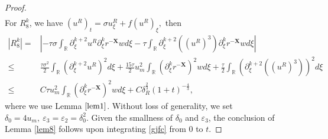 \documentclass[10pt,reqno]{amsart}
\numberwithin{equation}{section}
\begin{document}
\begin{proof}
\begin{align*}
		\end{align*}
		For $R_8^k$, we have $(u^R)_t=\sigma u^R_{\xi}+f(u^R)_{\xi},$ then
		\begin{align*}
			\left|R_8^k\right|=&\left|-\tau\sigma\int_{\mathbb{R}}\partial_{\xi}^{k+2}u^R\partial_{\xi}^kr^{-\mathbf{X}}wd\xi-\tau\int_{\mathbb{R}}\partial_{\xi}^{k+2}\left((u^R)^3\right)\partial_{\xi}^{k}r^{-\mathbf{X}}wd\xi\right|\\
			\leq&\frac{\tau\sigma^2}{2}\int_{\mathbb{R}}\left(\partial_{\xi}^{k+2}u^R\right)^2d\xi+\frac{15\tau}{2}u_m^2\int_{\mathbb{R}}\left(\partial_{\xi}^kr^{-\mathbf{X}}\right)^2wd\xi+\frac{\tau}{2}\int_{\mathbb{R}}\left(\partial_{\xi}^{k+2}\left((u^R)^3\right)\right)^2d\xi\\
			\leq&C\tau u_m^2\int_{\mathbb{R}}\left(\partial_{\xi}^kr^{-\mathbf{X}}\right)^2wd\xi+C\delta_{R}^{\frac{2}{3}}(1+t)^{-\frac{4}{3}},
		\end{align*}
		where we use Lemma $\ref{lem1}$. Without loss of generality, we set $\delta_{0}=4u_m,\ \varepsilon_{3}=\varepsilon_{2}=\delta_{0}^2.$ Given the smallness of $\delta_{0}$ and $\varepsilon_{3}$, the conclusion of Lemma \ref{lem8} follows upon integrating \eqref{gjfc} from $0$ to $t$.
	\end{proof}
	
\end{document}
